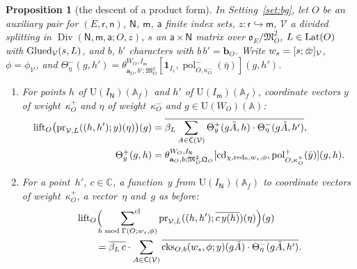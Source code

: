 \documentclass[11pt,a4paper]{article}
\newcommand{\m}[1]{\mbox{$#1$}}        %
\theoremstyle{plainx}
\newtheorem{proposition}[theorem]{Proposition}
\theoremstyle{uprightx}
\newcommand{\CC}{\mathbb{C}}
\newcommand{\AAA}{\mathbb{A}}
\newcommand{\ix}[1]{\mathsf{#1}}
\newcommand{\OEr}{\mathfrak{o}_E}
\newcommand{\UU}{\mathrm{U}}
\newcommand{\clsum}[2]{\sideset{}{^{\mathrm{cl}}}\sum_{#1\bmod #2}}
\newcommand{\tk}[7]{\theta^{#1,#2}_{#3,#4;#5}[#6,#7]}
\newcommand{\dsc}[1]{\operatorname{lift}_{#1}}
\newcommand{\cks}[5]{\operatorname{cks}_{#1,#2}(#3,#4;#5)}
\begin{document}
\begin{proposition}[the descent of a product form]\label{p:thetaprod}
In Setting~\ref{set:bg}, let $O$ be an auxiliary pair for \m{(E,\ix r,\ix n)}, \m{\ix N}, \m{\ix m}, \m{\ix a} finite
index sets, \m{z\colon\ix r\hookrightarrow\ix m}, $\mathcal{V}$ a divided splitting in
\m{\operatorname{Div}(\ix N,\ix m,\ix a;O,z)}, $s$ an \m{\ix a\times\ix N} matrix over \m{\OEr/\mathfrak{M}_O^{2}},
\m{L\in\DividedLattice{O}} with \m{\IsGlued{\mathcal{V}}{s}{L}}, and $b$, $b'$ characters with \m{b\,b'=\mathbf{b}_O}.
Write \m{w_s=\stackOverGenScalar{\mathcal{V}}{s}}, \m{\phi=\phi_{\mathcal{V}}}, and
\m{\Theta^{-}_{\eta}(g,h')=\tk{W_O}{I_{\ix m}}{\mathbf{a}_O}{b'}{\mathfrak{M}_O^{2}}{\mathbf{1}_{I_z}}{\operatorname{pol}^{-}_{O,\kappa^{-}_O}(\bar\eta)}(g,h')}.
\begin{enumerate}[label=\textup{(\alph*)},leftmargin=2.3em,itemsep=2pt]
\item For points $h$ of \m{\UU(I_{\ix N})(\AAA_f)} and $h'$ of \m{\UU(I_{\ix m})(\AAA_f)}, coordinate vectors $y$ of
weight~$\kappa^{+}_O$ and $\eta$ of weight~$\kappa^{-}_O$ and \m{g\in\UU(W_O)(\AAA)}:
\begin{align*}
\dsc{O}\bigl(\productForm{\mathcal{V}}{L}{(h,h')}{y}(\eta)\bigr)(g)&=\overline{\weilScalar{L}\sum_{A\in\congruenceGroup{\mathcal{V}}}
\Theta^{+}_{y}(g\tilde A,h)\cdot\Theta^{-}_{\eta}(g\tilde A,h')},\\
\Theta^{+}_{y}(g,h)&=\tk{W_O}{I_{\ix N}}{\mathbf{a}_O}{b}{\mathfrak{M}_O^{2}\mathfrak{Q}_O}{\operatorname{cd}_{\chi,\operatorname{red}_0,w_s,\phi}}{\operatorname{pol}^{+}_{O,\kappa^{+}_O}(\bar y)}(g,h).
\end{align*}
\item For a point~$h'$, \m{c\in\CC}, a function~$y$ from \m{\UU(I_{\ix N})(\AAA_f)} to coordinate vectors of
weight~$\kappa^{+}_O$, a vector~$\eta$ and~$g$ as before:
\begin{align*}
&\dsc{O}\Bigl(\clsum{h}{\rowFixingLevel{O}{w_s}{\phi}}\productForm{\mathcal{V}}{L}{(h,h')}{\overline{c\,y(h)}}(\eta)\Bigr)(g)\\
&\qquad=\overline{\weilScalar{L}\,c}\cdot\sum_{A\in\congruenceGroup{\mathcal{V}}}\overline{\cks{O}{b}{w_s}{\phi}{y}(g\tilde A)\cdot\Theta^{-}_{\eta}(g\tilde A,h')}.
\end{align*}
\end{enumerate}
\end{proposition}
\end{document}
